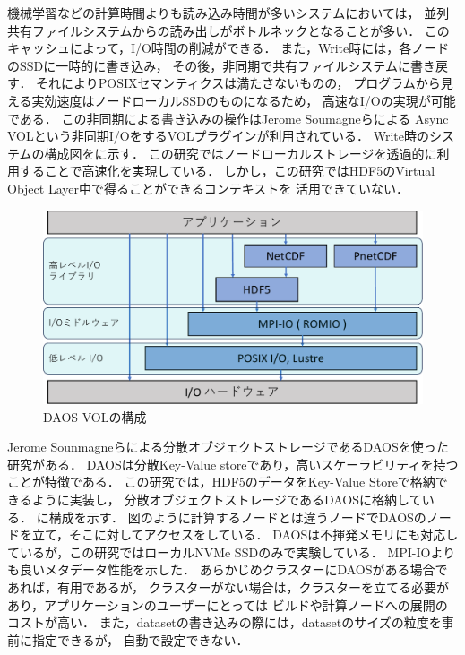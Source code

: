 \documentclass[submit,techrep,noauthor]{ipsj}
\begin{document}
機械学習などの計算時間よりも読み込み時間が多いシステムにおいては，
並列共有ファイルシステムからの読み出しがボトルネックとなることが多い．
このキャッシュによって，I/O時間の削減ができる．
また，Write時には，各ノードのSSDに一時的に書き込み，
その後，非同期で共有ファイルシステムに書き戻す．
それによりPOSIXセマンティクスは満たさないものの，
プログラムから見える実効速度はノードローカルSSDのものになるため，
高速なI/Oの実現が可能である．
この非同期による書き込みの操作はJerome Soumagneらによる
Async VOL\cite{tang2021transparent}という非同期I/OをするVOLプラグインが利用されている．
Write時のシステムの構成図をに示す．
この研究ではノードローカルストレージを透過的に利用することで高速化を実現している．
しかし，この研究ではHDF5のVirtual Object Layer中で得ることができるコンテキストを
活用できていない．

\begin{figure}[t]
	\centering
	\includegraphics[page=6,width=\linewidth]{figure-crop.pdf}
	\caption{DAOS VOLの構成}
	\label{fig:voldaos}
\end{figure}

Jerome Sounmagneらによる分散オブジェクトストレージであるDAOSを使った研究がある\cite{soumagne2021accelerating}．
DAOSは分散Key-Value storeであり，高いスケーラビリティを持つことが特徴である．
この研究では，HDF5のデータをKey-Value Storeで格納できるように実装し，
分散オブジェクトストレージであるDAOSに格納している．
に構成を示す．
図のように計算するノードとは違うノードでDAOSのノードを立て，そこに対してアクセスをしている．
DAOSは不揮発メモリにも対応しているが，この研究ではローカルNVMe SSDのみで実験している．
MPI-IOよりも良いメタデータ性能を示した．
あらかじめクラスターにDAOSがある場合であれば，有用であるが，
クラスターがない場合は，クラスターを立てる必要があり，アプリケーションのユーザーにとっては
ビルドや計算ノードへの展開のコストが高い．
また，datasetの書き込みの際には，datasetのサイズの粒度を事前に指定できるが，
自動で設定できない．
\end{document}
